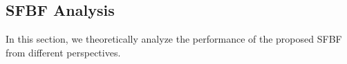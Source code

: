 \documentclass[10pt,journal,compsoc]{IEEEtran}
\newcommand{\rev}[1]{#1}
\begin{document}
%
%
%

%

\subsection{SFBF Analysis}
\label{subsec:SFBF Analysis}

In this section, we theoretically analyze the performance of the proposed SFBF from different perspectives.
\end{document}
